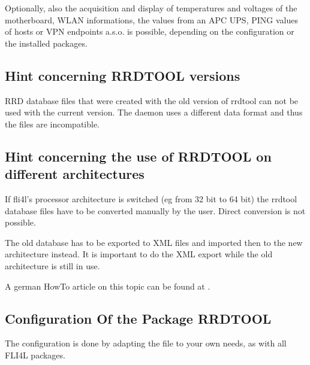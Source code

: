 Optionally, also the acquisition and display of temperatures and voltages of the
motherboard, WLAN informations, the values from an APC UPS, PING values of hosts
or VPN endpoints a.s.o. is possible, depending on the configuration or the installed
packages.

\subsection {Hint concerning RRDTOOL versions}

  RRD database files that were created with the old version of rrdtool
  can not be used with the current version. The daemon uses a different data
  format and thus the files are incompatible.

\subsection {Hint concerning the use of RRDTOOL on different architectures}

  If fli4l's processor architecture is switched (eg from 32 bit to 64 bit)
  the rrdtool database files have to be converted manually by the user.
  Direct conversion is not possible.

  The old database has to be exported to XML files and imported then to the
  new architecture instead. It is important to do the XML export while
  the old architecture is still in use.

  A german HowTo article on this topic can be found at
  .

\subsection {Configuration Of the Package RRDTOOL}

  The configuration is done by adapting the file
  to your own needs, as with all FLI4L packages.

